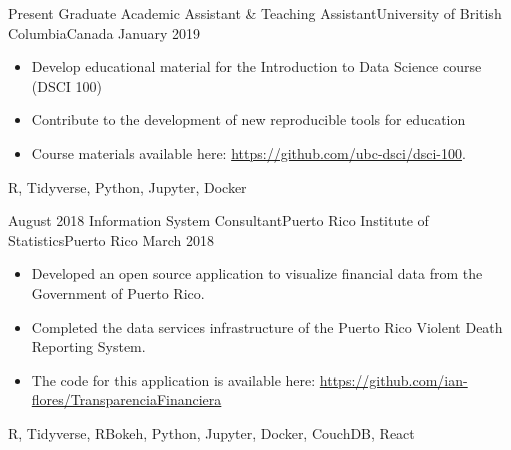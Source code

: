 %
%
%
\begin{experiences}
  \experience
    {Present}   {Graduate Academic Assistant \& Teaching Assistant}{University of British Columbia}{Canada}
    {January 2019} {
                      \begin{itemize}
                        \item Develop educational material for the Introduction to Data Science course (DSCI 100)
                        \item Contribute to the development of new reproducible tools for education
                        \item Course materials available here: \href{https://github.com/ubc-dsci/dsci-100}{https://github.com/ubc-dsci/dsci-100}.
                      \end{itemize}
                    }
                    {R, Tidyverse, Python, Jupyter, Docker}
  \emptySeparator
  
  \experience
    {August 2018}   {Information System Consultant}{Puerto Rico Institute of Statistics}{Puerto Rico}
    {March 2018} {
                      \begin{itemize}
                        \item Developed an open source application to visualize financial data from the Government of Puerto Rico.                         
                        \item Completed the data services infrastructure of the Puerto Rico Violent Death Reporting System.
                        \item The code for this application is available here: \newline
                        \href{https://github.com/ian-flores/TransparenciaFinanciera}{https://github.com/ian-flores/TransparenciaFinanciera}
                      \end{itemize}
                    }
                    {R, Tidyverse, RBokeh, Python, Jupyter, Docker, CouchDB, React}
  \emptySeparator
  

\end{experiences}
